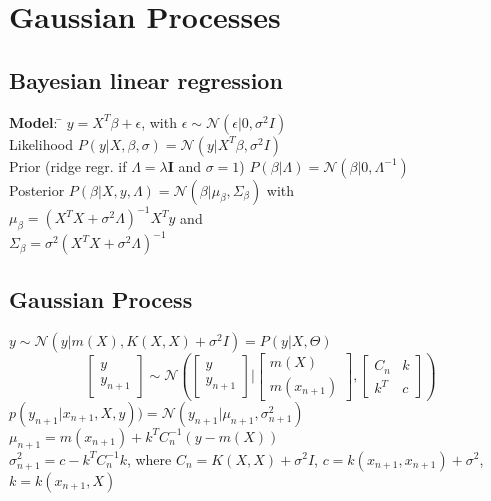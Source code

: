 \section{Gaussian Processes}

\subsection*{Bayesian linear regression}
	\textbf{Model}:  \= $y = X^T \beta + \epsilon$, with $\epsilon \sim
	\mathcal{N}(\epsilon | 0, \sigma^2 I)$\\ 
	Likelihood $P(y | X, \beta, \sigma) = \mathcal{N}(y | X^T \beta , \sigma^2 I)$\\
	Prior (ridge regr. if $\Lambda = \lambda\mathbf{I}$ and $\sigma=1$) $P(\beta | \Lambda) = \mathcal{N} (\beta | 0, \Lambda^{-1})$\\ Posterior $P(\beta | X, y, \Lambda) = \mathcal{N}(\beta | \mu_\beta, \Sigma_\beta)$ with \\
	$\mu_\beta = (X^T X + \sigma^2 \Lambda)^{-1} X^T y$ and \\
	$\Sigma_\beta = \sigma^2(X^T X + \sigma^2 \Lambda)^{-1}$ \\

\subsection*{Gaussian Process}
    $y \sim \mathcal{N}(y | m(X), K(X,X) + \sigma^2 I) = P(y|X,\Theta)$ 
    $$\left[\begin{smallmatrix} y \\y_{n+1}\end{smallmatrix}\right] \sim \mathcal{N}\left(\left[\begin{smallmatrix} y \\y_{n+1}\end{smallmatrix}\right]|[\begin{smallmatrix} m(X) \\m(x_{n+1})\end{smallmatrix}], [\begin{smallmatrix} C_n & k \\ k^T & c\end{smallmatrix}]\right)$$
    $p(y_{n+1}|x_{n+1}, X, y)) = \mathcal{N}(y_{n+1} | \mu_{n+1}, \sigma^2_{n+1})$	\\
    $\mu_{n+1} = m(x_{n+1})+k^T C^{-1}_n (y\!-\!m(X))$ \\
    $\sigma^2_{n+1} = c - k^T C^{-1}_n k$, where $C_n = K(X,X) + \sigma^2 I$, $c = k(x_{n+1},x_{n+1})\!+\!\sigma^2$, $k = k(x_{n+1}, X)$

